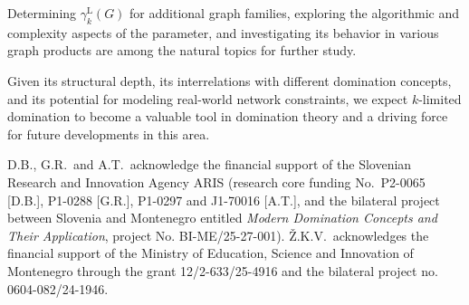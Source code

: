 \documentclass[11pt]{article}
\begin{document}
Determining 
$\gamma^{\mathrm L}_k(G)$ for additional graph families, exploring the algorithmic and 
complexity aspects of the parameter, and investigating its behavior in various graph
products are among the natural topics for further study.

Given its structural depth, its interrelations with different domination concepts, and its potential for modeling real-world network constraints, we expect $k$-limited domination to become a valuable tool in domination theory and a driving
force for future developments in this area.













\vskip 1pc  

D.B., G.R.~and A.T.~acknowledge the financial support of the Slovenian Research and Innovation Agency ARIS (research core funding No.\ P2-0065 [D.B.], P1-0288 [G.R.], P1-0297 and J1-70016 [A.T.], and the bilateral project between Slovenia and Montenegro entitled {\it Modern Domination Concepts and Their Application}, project No. BI-ME/25-27-001). %
\v{Z}.K.V.~acknowledges the financial support of the  Ministry of Education, Science and Innovation of Montenegro through the grant 12/2-633/25-4916 and the bilateral project no. 0604-082/24-1946.




\end{document}
